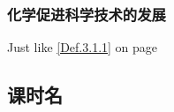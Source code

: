 \documentclass[color=COLORFUL]{textbook-cn}%
\begin{document}
\begin{Paracol}
\begin{Theorem}[定理名称]
\lipsum[1][2-6]
\end{Theorem}


\begin{Proof}
\lipsum[1]
\end{Proof}




\begin{Lemma}[引理名称]
\zhlipsum[2]
\end{Lemma}


\begin{Proposition}[命题名称命题名称命题名称命题名称命题名称]
\zhlipsum[2]
\end{Proposition}

\begin{Warning}
\lipsum[1][1-3]
\end{Warning}


\subsubsection{化学促进科学技术的发展}

\lipsum[1-2]




\Answer{\lipsum[1][1-7]}




\begin{Definition*}[定义名称]
\lipsum[1][1-3]
\end{Definition*}

Just like \ref{Def.3.1.1} on page \pageref{Def.3.1.1}





\begin{Link}
\zhlipsum
\end{Link}



\lipsum[2]

\begin{Practice}
\lipsum[1][1-5]
\end{Practice}


\subsection{课时名}
\lipsum[3]


\end{Paracol}
\end{document}
